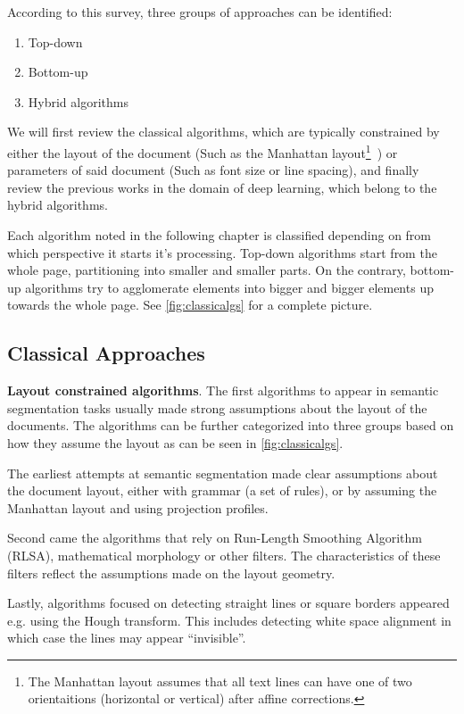 \documentclass[oneside, english, bibtex]{kththesis}
\begin{document}
According to this survey, three groups of approaches can be identified:

\begin{enumerate}
\item Top-down
\item Bottom-up
\item Hybrid algorithms
\end{enumerate}

We will first review the classical algorithms, which are typically constrained by either the layout of the document (Such as the Manhattan layout\footnote{The Manhattan layout assumes that all text lines can have one of two orientaitions (horizontal or vertical) after affine corrections.}~\cite{395720}) or parameters of said document (Such as font size or line spacing), and finally review the previous works in the domain of deep learning, which belong to the hybrid algorithms.

Each algorithm noted in the following chapter is classified depending on from which perspective it starts it's processing. Top-down algorithms start from the whole page, partitioning into smaller and smaller parts. On the contrary, bottom-up algorithms try to agglomerate elements into bigger and bigger elements up towards the whole page. See \autoref{fig:classicalgs} for a complete picture.

\subsection{Classical Approaches}

\textbf{Layout constrained algorithms}. The first algorithms to appear in semantic segmentation tasks usually made strong assumptions about the layout of the documents. The algorithms can be further categorized into three groups based on how they assume the layout as can be seen in \autoref{fig:classicalgs}.

The earliest attempts at semantic segmentation made clear assumptions about the document layout, either with grammar (a set of rules), or by assuming the Manhattan layout and using projection profiles.

Second came the algorithms that rely on Run-Length Smoothing Algorithm (RLSA), mathematical morphology or other filters. The characteristics of these filters reflect the assumptions made on the layout geometry.

Lastly, algorithms focused on detecting straight lines or square borders appeared e.g. using the Hough transform. This includes detecting white space alignment in which case the lines may appear “invisible”.
\end{document}

